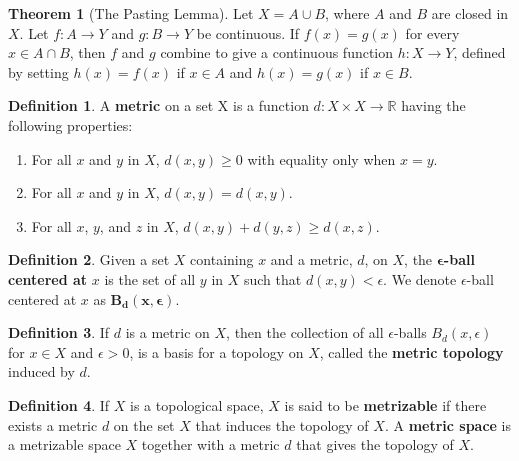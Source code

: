 \documentclass{article}
\theoremstyle{definition}
\newtheorem{definition}{Definition}[section]
\newtheorem{theorem}{Theorem}[section]
\begin{document}
\begin{theorem}[The Pasting Lemma]
    Let $X = A \cup B$, where $A$ and $B$ are closed in $X$. Let $f: A \rightarrow Y$ and $g: B \rightarrow Y$ be continuous. If $f(x) = g(x)$ for every $x \in A \cap B$, then $f$ and $g$ combine to give a continuous function $h: X \rightarrow Y$, defined by setting $h(x) = f(x)$ if $x \in A$ and $h(x) = g(x)$ if $x \in B$.
\end{theorem}
\begin{definition}
    A \textbf{metric} on a set X is a function $d: X \times X \rightarrow \mathbb{R}$ having the following properties:
    \begin{enumerate}
        \item For all $x$ and $y$ in $X$, $d(x, y) \geq 0$ with equality only when $x = y$.
        \item For all $x$ and $y$ in $X$, $d(x, y) = d(x, y)$.
        \item For all $x$, $y$, and $z$ in $X$, $d(x, y) + d(y, z) \geq d(x, z)$.
    \end{enumerate}
\end{definition}
\begin{definition}
    Given a set $X$ containing $x$ and a metric, $d$, on $X$, the $\mathbf{\epsilon}$\textbf{-ball centered at} $x$ is the set of all $y$ in $X$ such that $d(x, y) < \epsilon$. We denote $\epsilon$-ball centered at $x$ as $\mathbf{B_d(x, \epsilon)}$.
\end{definition}
\begin{definition}
    If $d$ is a metric on $X$, then the collection of all $\epsilon$-balls $B_d(x, \epsilon)$ for $x \in X$ and $\epsilon > 0$, is a basis for a topology on $X$, called the \textbf{metric topology} induced by $d$.
\end{definition}
\begin{definition}
    If $X$ is a topological space, $X$ is said to be \textbf{metrizable} if there exists a metric $d$ on the set $X$ that induces the topology of $X$. A \textbf{metric space} is a metrizable space $X$ together with a metric $d$ that gives the topology of $X$.
\end{definition}


\end{document}
